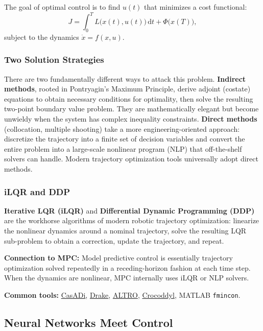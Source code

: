 The goal of optimal control is to find $u(t)$ that minimizes a cost functional:
\[
J = \int_0^T L\bigl(x(t), u(t)\bigr)\,\mathrm{d}t + \Phi\bigl(x(T)\bigr),
\]
subject to the dynamics $\dot{x} = f(x, u)$.

\subsubsection{Two Solution Strategies}

There are two fundamentally different ways to attack this problem. \textbf{Indirect methods}, rooted in Pontryagin's Maximum Principle, derive adjoint (costate) equations to obtain necessary conditions for optimality, then solve the resulting two-point boundary value problem. They are mathematically elegant but become unwieldy when the system has complex inequality constraints. \textbf{Direct methods} (collocation, multiple shooting) take a more engineering-oriented approach: discretize the trajectory into a finite set of decision variables and convert the entire problem into a large-scale nonlinear program (NLP) that off-the-shelf solvers can handle. Modern trajectory optimization tools universally adopt direct methods.

\subsubsection{iLQR and DDP}

\textbf{Iterative LQR (iLQR)} and \textbf{Differential Dynamic Programming (DDP)} are the workhorse algorithms of modern robotic trajectory optimization: linearize the nonlinear dynamics around a nominal trajectory, solve the resulting LQR sub-problem to obtain a correction, update the trajectory, and repeat.

\textbf{Connection to MPC:} Model predictive control is essentially trajectory optimization solved repeatedly in a receding-horizon fashion at each time step. When the dynamics are nonlinear, MPC internally uses iLQR or NLP solvers.

\textbf{Common tools:} \href{https://web.casadi.org/}{CasADi}, \href{https://drake.mit.edu/}{Drake}, \href{https://arxiv.org/abs/2007.01850}{ALTRO}, \href{https://github.com/loco-3d/crocoddyl}{Crocoddyl}, MATLAB \texttt{fmincon}.

\subsection{Neural Networks Meet Control}

